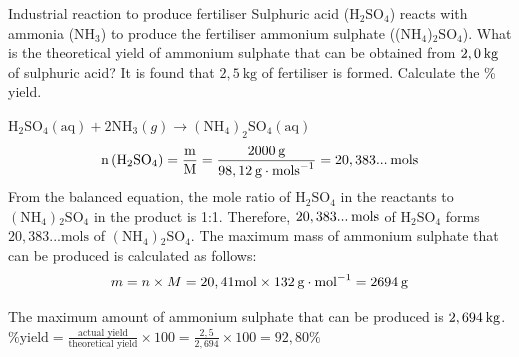  \par \label{m38712*secfhsst!!!underscore!!!id2067}\vspace{-2cm} 
      \noindent 
      \begin{wex}{Industrial reaction to produce fertiliser }
{
\label{m38712*probfhsst!!!underscore!!!id2068}
      \label{m38712*id284606}Sulphuric acid ($\text{H}{}_{2}\text{SO}{}_{4}$) reacts with ammonia ($\text{NH}{}_{3}$) to produce the fertiliser ammonium sulphate (($\text{NH}{}_{4}$)${}_{2}\text{SO}{}_{4}$). What is the theoretical yield of ammonium sulphate that can be obtained from $2,0\phantom{\rule{2pt}{0ex}}\text{kg}$ of sulphuric acid? It is found that $2,5 ~\text{kg}$ of fertiliser is formed. Calculate the \% yield. }
{
      \label{m38712*id284813}\nopagebreak\noindent{}
\label{m38712*id284690}${\text{H}}_{2}{\text{SO}}_{4}\left(\text{aq}\right)+2{\text{NH}}_{3}\left(g\right)\to {\left({\text{NH}}_{4}\right)}_{2}{\text{SO}}_{4}\left(\text{aq}\right)$
    \begin{equation*}
    \text{n}\left({\text{H}}_{2}{\text{SO}}_{4}\right)=\frac{\text{m}}{\text{M}}=\frac{2 000\phantom{\rule{2pt}{0ex}}\text{g}}{98,12\phantom{\rule{2pt}{0ex}}\text{g}\ensuremath{\cdot}{\text{mols}}^{-1}}=20,383...\phantom{\rule{2pt}{0ex}}\text{mols}
      \end{equation*}
      \label{m38712*id285156}From the balanced equation, the mole ratio of $\text{H}{}_{2}\text{SO}{}_{4}$ in the reactants to $\left(\text{NH}{}_{4}\right){}_{2}\text{SO}{}_{4}$ in the product is 1:1. Therefore, $20,383...\phantom{\rule{2pt}{0ex}}\text{mols}$ of $\text{H}{}_{2}\text{SO}{}_{4}$ forms $20,383... \text{mols}$ of $\left(\text{NH}{}_{4}\right){}_{2}\text{SO}{}_{4}$. 
      \label{m38712*id285290}The maximum mass of ammonium sulphate that can be produced is calculated as follows:
      \label{m38712*id285296}\nopagebreak\noindent{}
    \begin{equation*}
    m=n\ensuremath{\times}M=20,41\text{mol}\ensuremath{\times}132\phantom{\rule{2pt}{0ex}}\text{g}\ensuremath{\cdot}{\text{mol}}^{-1}=2694\phantom{\rule{2pt}{0ex}}\text{g}
      \end{equation*}
      
      \label{m38712*id285362}The maximum amount of ammonium sulphate that can be produced is $2,694\phantom{\rule{2pt}{0ex}}\text{kg}$.
 $\text{\% yield} = \frac{\text{actual yield}}{\text{theoretical yield}} \times 100 = \frac{2,5}{2,694} \times 100 = 92,80 \%$
}
    \end{wex}
